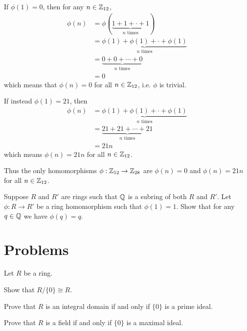 \begin{example}
    If $\phi(1) = 0$, then for any $n \in \mathbb{Z}_{12}$,
    \begin{align*}
        \phi(n) &= \phi(\underbrace{1 + 1 + \cdot + 1}_{n \text{ times}})\\
        &= \underbrace{\phi(1) + \phi(1) + \cdot + \phi(1)}_{n \text{ times}}\\
        &= \underbrace{0 + 0 + \cdots + 0}_{n \text{ times}}\\
        &= 0
    \end{align*}
    which means that $\phi(n) = 0$ for all $n \in \mathbb{Z}_{12}$, i.e. $\phi$ is trivial.

    If instead $\phi(1) = 21$, then
    \begin{align*}
        \phi(n) &= \underbrace{\phi(1) + \phi(1) + \cdot + \phi(1)}_{n \text{ times}}\\
        &= \underbrace{21 + 21 + \cdots + 21}_{n \text{ times}}\\
        &= 21n
    \end{align*}
    which means $\phi(n) = 21n$ for all $n \in \mathbb{Z}_{12}$.

    Thus the only homomorphisms $\phi: \mathbb{Z}_{12} \to \mathbb{Z}_{28}$ are $\phi(n) = 0$ and $\phi(n) = 21n$ for all $n \in \mathbb{Z}_{12}$.
\end{example}

\begin{exercise}\label{exercise-homomorphism-over-Q-fixes-elements-of-Q}
    Suppose $R$ and $R'$ are rings such that $\mathbb{Q}$ is a subring of both $R$ and $R'$. Let $\phi: R \to R'$ be a ring homomorphism such that $\phi(1) = 1$. Show that for any $q \in \mathbb{Q}$ we have $\phi(q) = q$.
\end{exercise}

\newpage

\section{Problems}
\begin{problem}
    Let $R$ be a ring.
    \begin{partquestions}{\roman*}
        \item Show that $R/\{0\} \cong R$.
        \item Prove that $R$ is an integral domain if and only if $\{0\}$ is a prime ideal.
        \item Prove that $R$ is a field if and only if $\{0\}$ is a maximal ideal.
    \end{partquestions}
\end{problem}

